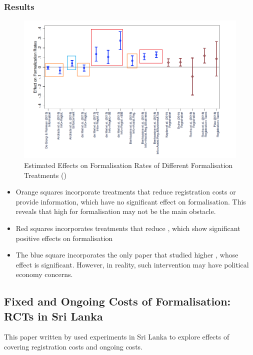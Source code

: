         \subsubsection{Results}
            \begin{figure}[H]
                \centering
                \includegraphics[width=5in]{images/ch5/formal policies evaluation.png}
                \caption{Estimated Effects on Formalisation Rates of Different Formalisation Treatments (\cite{ulyssea_informality_2020})}
            \end{figure}
            \begin{itemize}
                \item Orange squares incorporate treatments that reduce registration costs or provide information, which have no significant effect on formalisation. This reveals that high  for formalisation may not be the main obstacle.
                \item Red squares incorporates treatments that reduce , which show significant positive effects on formalisation
                \item The blue square incorporates the only paper that studied higher , whose effect is significant. However, in reality, such intervention may have political economy concerns.
            \end{itemize}
    
    \subsection{Fixed and Ongoing Costs of Formalisation: RCTs in Sri Lanka}
        This paper written by \cite{de_mel_demand_2013} used experiments in Sri Lanka to explore effects of covering registration costs and ongoing costs.
        
